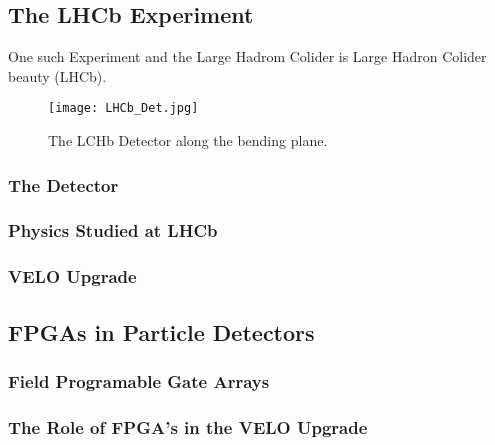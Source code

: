 \subsection{The LHCb Experiment}

One such Experiment and the Large Hadrom Colider is Large Hadron Colider beauty (LHCb).







\begin{figure}[h]
  \centering
  \texttt{[image: LHCb\_Det.jpg]}
  \caption{The LCHb Detector along the bending plane.}
  \label{fig:LCHb_Collab}
\end{figure}

\subsubsection{The Detector}

\subsubsection{Physics Studied at LHCb}

\subsubsection{VELO Upgrade}

\subsection{FPGAs in Particle Detectors}

\subsubsection{Field Programable Gate Arrays}

\subsubsection{The Role of FPGA's in the VELO Upgrade}
